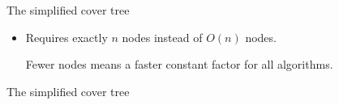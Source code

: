 \begin{frame}[fragile]{The simplified cover tree}
{\begin{itemize}
The original cover tree was described in terms of an infinitely large tree, only a subset of which actually gets implemented.

\vspace{0.05in}
\item Requires exactly $n$ nodes instead of $O(n)$ nodes.

Fewer nodes means a faster constant factor for all algorithms. %
\end{itemize}
\vspace{1.3in}
}

\end{frame}


\begin{frame}[fragile]{The simplified cover tree}

\centering
\graphicspath{{slides/covertree/paperimg/}}


\end{frame}
